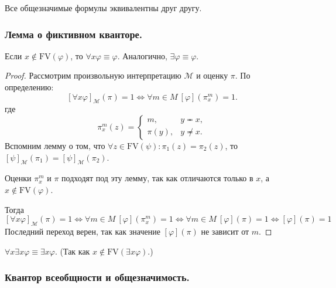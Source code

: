 \documentclass[a4paper, fleqn]{article}
\begin{document}
    \begin{corollary}
        Все общезначимые формулы эквивалентны друг другу.
    \end{corollary}

    \subsubsection{Лемма о фиктивном кванторе.}

    \begin{lemma}
        Если $x \notin \text{FV}(\varphi)$, то $\forall x \varphi \equiv \varphi$.
        Аналогично, $\exists \varphi \equiv \varphi$.
    \end{lemma}

    \begin{proof}
        Рассмотрим произвольную интерпретацию $\mathcal{M}$ и оценку $\pi$. По определению: 
        \[
            [\forall x \varphi]_{\mathcal{M}}(\pi) = 1 \iff \forall m \in M~ [\varphi](\pi_{x}^{m}) = 1.
        \]
        где 
        \[
            \pi_{x}^{m}(z) = 
            \begin{cases}
                m, & y \eqcirc x,  \\
                \pi(y), & y \not \eqcirc x.
            \end{cases}
        \]
        Вспомним лемму о том, что $\forall z \in \text{FV}(\psi) \colon \pi_{1}(z) = 
        \pi_{2}(z)$, то $[\psi]_{\mathcal{M}}(\pi_{1}) = [\psi]_{\mathcal{M}}(\pi_{2})$.
        
        Оценки $\pi_{x}^{m}$ и $\pi$ подходят под эту лемму, так как отличаются только в $x$, 
        а $x \notin \text{FV}(\varphi)$. 

        Тогда
        \[
            [\forall x \varphi]_{\mathcal{M}}(\pi) = 1 \iff \forall m \in M~ [\varphi](\pi_{x}^{m}) = 1 \iff
            \forall m \in M~ [\varphi](\pi) = 1 \iff [\varphi](\pi) = 1
        \]
        Последний переход верен, так как значение $[\varphi](\pi)$ не зависит от $m$.
    \end{proof}

    \begin{corollary}
        $\forall x \exists x \varphi \equiv \exists x \varphi$. 
        (Так как $x \notin \text{FV}(\exists x \varphi)$.)
    \end{corollary}


    \subsubsection{Квантор всеобщности и общезначимость.}
\end{document}
